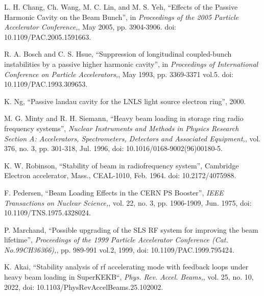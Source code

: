 \documentclass[letterpaper,
               nospread,     %
               ]{jacow}
\begin{document}
%
%
{\printbibliography}%
{%

   \begin{thebibliography}{99}   %

      L. H. Chang, Ch. Wang, M. C. Lin, and M. S. Yeh, “Effects of the Passive Harmonic Cavity on the Beam Bunch”, in
      \textit{Proceedings of the 2005 Particle Accelerator Conference,},
      May 2005, pp. 3904-3906. doi: 10.1109/PAC.2005.1591663.

      R. A. Bosch and C. S. Hsue, “Suppression of longitudinal coupled-bunch instabilities by a passive higher harmonic cavity”, in
      \textit{Proceedings of International Conference on Particle Accelerators,},
      May 1993, pp. 3369-3371 vol.5. doi: 10.1109/PAC.1993.309653.

      K. Ng, “Passive landau cavity for the LNLS light source electron ring”, 2000.

      M. G. Minty and R. H. Siemann, “Heavy beam loading in storage ring radio frequency systems”,
      \textit{Nuclear Instruments and Methods in Physics Research Section A: Accelerators, Spectrometers, Detectors and Associated Equipment,},
      vol. 376, no. 3, pp. 301-318, Jul. 1996, doi: 10.1016/0168-9002(96)00180-5.

      K. W. Robinson, “Stability of beam in radiofrequency system”, Cambridge Electron accelerator, Mass., CEAL-1010, Feb. 1964. doi: 10.2172/4075988.

      F. Pedersen, “Beam Loading Effects in the CERN PS Booster”,
      \textit{IEEE Transactions on Nuclear Science,},
      vol. 22, no. 3, pp. 1906-1909, Jun. 1975, doi: 10.1109/TNS.1975.4328024.

      P. Marchand, “Possible upgrading of the SLS RF system for improving the beam lifetime”,
      \textit{Proceedings of the 1999 Particle Accelerator Conference (Cat. No.99CH36366),},
      pp. 989-991 vol.2, 1999, doi: 10.1109/PAC.1999.795424.

      K. Akai, “Stability analysis of rf accelerating mode with feedback loops under heavy beam loading in SuperKEKB“,
      \textit{Phys. Rev. Accel. Beams,},
      vol. 25, no. 10, 2022, doi: 10.1103/PhysRevAccelBeams.25.102002.


\end{thebibliography}}
\end{document}
